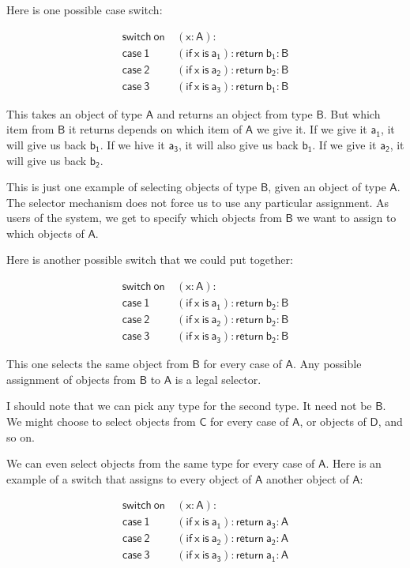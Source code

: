 \documentclass{article}
\newcommand\term{\mathsf}
\begin{document}
Here is one possible case switch:

\begin{align*}
  \term{switch~on}~&\term{(x : A)}: \\
  \term{case~1}~&\term{(if~x~is~a_{1}) : return~b_{1} : B} \\
  \term{case~2}~&\term{(if~x~is~a_{2}) : return~b_{2} : B} \\
  \term{case~3}~&\term{(if~x~is~a_{3}) : return~b_{1} : B}
\end{align*}

This takes an object of type $\term{A}$ and returns an object from type $\term{B}$. But which item from $\term{B}$ it returns depends on which item of $\term{A}$ we give it. If we give it $\term{a_{1}}$, it will give us back $\term{b_{1}}$. If we hive it $\term{a_{3}}$, it will also give us back $\term{b_{1}}$. If we give it $\term{a_{2}}$, it will give us back $\term{b_{2}}$.

This is just one example of selecting objects of type $\term{B}$, given an object of type $\term{A}$. The selector mechanism does not force us to use any particular assignment. As users of the system, we get to specify which objects from $\term{B}$ we want to assign to which objects of $\term{A}$. 

Here is another possible switch that we could put together:

\begin{align*}
  \term{switch~on}~&\term{(x : A)}: \\
  \term{case~1}~&\term{(if~x~is~a_{1}) : return~b_{2} : B} \\
  \term{case~2}~&\term{(if~x~is~a_{2}) : return~b_{2} : B} \\
  \term{case~3}~&\term{(if~x~is~a_{3}) : return~b_{2} : B}
\end{align*}

This one selects the same object from $\term{B}$ for every case of $\term{A}$. Any possible assignment of objects from $\term{B}$ to $\term{A}$ is a legal selector.

I should note that we can pick any type for the second type. It need not be $\term{B}$. We might choose to select objects from $\term{C}$ for every case of $\term{A}$, or objects of $\term{D}$, and so on. 

We can even select objects from the same type for every case of $\term{A}$. Here is an example of a switch that assigns to every object of $\term{A}$ another object of $\term{A}$:

\begin{align*}
  \term{switch~on}~&\term{(x : A)}: \\
  \term{case~1}~&\term{(if~x~is~a_{1}) : return~a_{3} : A} \\
  \term{case~2}~&\term{(if~x~is~a_{2}) : return~a_{2} : A} \\
  \term{case~3}~&\term{(if~x~is~a_{3}) : return~a_{1} : A}
\end{align*}
\end{document}
